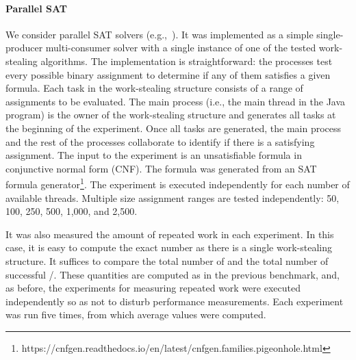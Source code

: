 \paragraph*{Parallel SAT}
We consider parallel SAT solvers (e.g.,~\cite{DBLP_journals_amai_BohmS96, DBLP_journals_entcs_FeldmanDH05, DBLP_books_sp_HS2018}). It was implemented as a simple single-producer multi-consumer solver with a single instance of one of the tested work-stealing algorithms. The implementation is straightforward: the processes test every possible binary assignment to determine if any of them satisfies a given formula. Each task in the work-stealing structure consists of a range of assignments to be evaluated.  The main process (i.e., the main thread in the Java program) is the owner of the work-stealing structure and generates all tasks at the beginning of the experiment. Once all tasks are generated, the main process and the rest of the processes collaborate to identify if there is a satisfying assignment.  The input to the experiment is an unsatisfiable formula in conjunctive normal form (CNF). The formula was generated from an SAT formula generator\footnote{https://cnfgen.readthedocs.io/en/latest/cnfgen.families.pigeonhole.html}.  The experiment is executed independently for each number of available threads.  Multiple size assignment ranges are tested independently: 50, 100, 250, 500, 1,000, and 2,500.

It was also measured the amount of repeated work in each experiment.  In this case, it is easy to compute the exact number as there is a single work-stealing structure. It suffices to compare the total number of \Puts and the total number of successful \Takes/\Steals. These quantities are computed as in the previous benchmark, and, as before, the experiments for measuring repeated work were executed independently so as not to disturb performance measurements. Each experiment was run five times, from which average values were computed.

